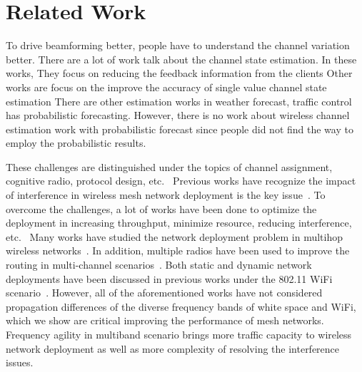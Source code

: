 \section{Related Work}
\label{sec:related}











To drive beamforming better, people have to understand the channel variation 
better. There are a lot of work talk about the channel state estimation\cite{gan2013multiple}.%
In these works, 
They focus on reducing the feedback information from the clients%
Other works are focus on the improve the accuracy of single value channel 
state estimation %
There are other estimation works in weather forecast, traffic control has 
probabilistic forecasting. However, there is no work about wireless channel
estimation work with probabilistic forecast since people did not find the way
to employ the probabilistic results.





These challenges are distinguished under the topics of channel assignment,
cognitive radio, protocol design, etc.~\cite{tragos2013spectrum,akyildiz2006next}
Previous works have recognize the impact of interference in 
wireless mesh network deployment is the key issue~\cite{tang2005interference,irwin2013resource,chieochan2013channel}.
To overcome the challenges, a lot of works have been done to optimize the 
deployment in increasing throughput, minimize resource, reducing interference,
etc.~\cite{irwin2013resource,subramanian2008minimum,doraghinejad2014channel}
Many works have studied the network deployment problem in multihop wireless
networks~\cite{jain2005impact,akyildiz2005wireless,raniwala2004centralized,tragos2013spectrum}.
In addition, multiple radios have been used to improve the routing in multi-channel
scenarios~\cite{draves2004routing,irwin2013resource}. 
Both static and dynamic network deployments have been discussed in previous works under
the 802.11 WiFi scenario~\cite{wu2006analysis,ramachandran2006interference,subramanian2008minimum}. 
However, all of the aforementioned works have not considered propagation 
differences of the diverse frequency bands of white space and WiFi, which we show are 
critical improving the performance of mesh networks.
Frequency agility in multiband scenario brings more traffic capacity to 
wireless network deployment as well as more complexity of resolving the interference issues.

